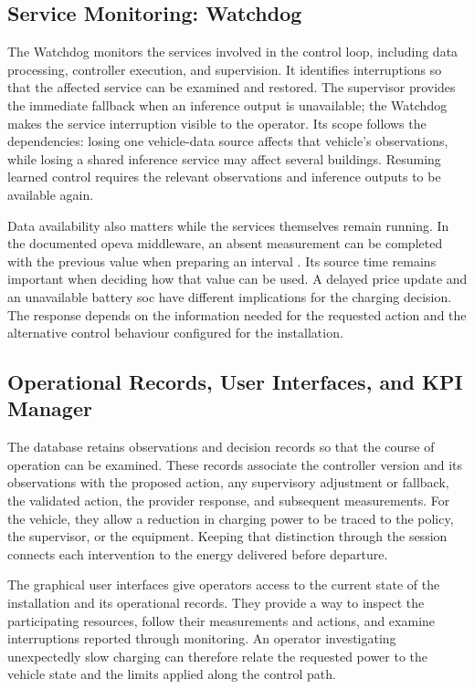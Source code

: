 \subsection{Service Monitoring: Watchdog}
\label{sec:energaize-watchdog}

The Watchdog monitors the services involved in the control loop, including data processing, controller execution, and supervision. It identifies interruptions so that the affected service can be examined and restored. The supervisor provides the immediate fallback when an inference output is unavailable; the Watchdog makes the service interruption visible to the operator. Its scope follows the dependencies: losing one vehicle-data source affects that vehicle's observations, while losing a shared inference service may affect several buildings. Resuming learned control requires the relevant observations and inference outputs to be available again.

Data availability also matters while the services themselves remain running. In the documented \gls{opeva} middleware, an absent measurement can be completed with the previous value when preparing an interval \parencite{opeva2026d63}. Its source time remains important when deciding how that value can be used. A delayed price update and an unavailable battery \gls{soc} have different implications for the charging decision. The response depends on the information needed for the requested action and the alternative control behaviour configured for the installation.

\subsection{Operational Records, User Interfaces, and KPI Manager}
\label{sec:energaize-records}

The database retains observations and decision records so that the course of operation can be examined. These records associate the controller version and its observations with the proposed action, any supervisory adjustment or fallback, the validated action, the provider response, and subsequent measurements. For the vehicle, they allow a reduction in charging power to be traced to the policy, the supervisor, or the equipment. Keeping that distinction through the session connects each intervention to the energy delivered before departure.

The graphical user interfaces give operators access to the current state of the installation and its operational records. They provide a way to inspect the participating resources, follow their measurements and actions, and examine interruptions reported through monitoring. An operator investigating unexpectedly slow charging can therefore relate the requested power to the vehicle state and the limits applied along the control path.

